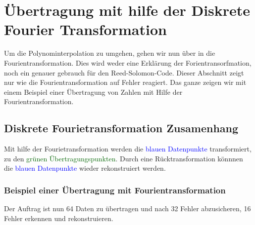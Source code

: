 %
%
%
\section{Übertragung mit hilfe der Diskrete Fourier Transformation
\label{reedsolomon:section:dtf}}
Um die Polynominterpolation zu umgehen, gehen wir nun über in die Fourientransformation.
Dies wird weder eine Erklärung der Forientransorfmation, noch ein genauer gebrauch für den Reed-Solomon-Code. 
Dieser Abschnitt zeigt nur wie die Fourientransformation auf Fehler reagiert.
Das ganze zeigen wir mit einem Beispiel einer Übertragung von Zahlen mit Hilfe der Fourientransformation.

\subsection{Diskrete Fourietransformation Zusamenhang
\label{reedsolomon:subsection:dtfzusamenhang}}
Mit hilfe der Fourietransformation werden die \textcolor{blue}{blauen Datenpunkte} transformiert,
zu den \textcolor{darkgreen}{grünen Übertragungspunkten}. 
Durch eine Rücktransformation könnnen die \textcolor{blue}{blauen Datenpunkte} wieder rekonstruiert werden.

\subsubsection{Beispiel einer Übertragung mit Fourientransformation
\label{reedsolomon:subsection:Übertragungsabfolge}}
Der Auftrag ist nun 64 Daten zu übertragen und nach 32 Fehler abzusicheren,
16 Fehler erkennen und rekonstruieren.

